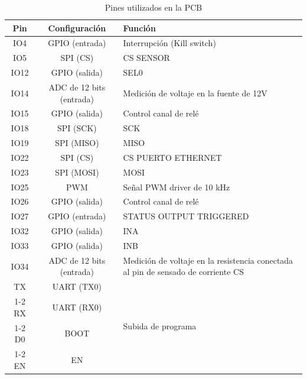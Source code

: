 \begin{table}[H]
\centering
\caption{Pines utilizados en la PCB}
\label{tab:pines_pcb}

\vspace{0.5em}

\begin{tabular}{|c|c|m{6.5cm}|}
\hline
Pin & Configuración & Función \\
\hline
IO4  & GPIO (entrada) & Interrupción (Kill switch) \\
\hline
IO5  & SPI (CS) & CS SENSOR \\
\hline
IO12 & GPIO (salida) & SEL0 \\
\hline
IO14 & ADC de 12 bits (entrada) & Medición de voltaje en la fuente de 12V \\
\hline
IO15 & GPIO (salida) & Control canal de relé \\
\hline
IO18 & SPI (SCK) & SCK \\
\hline
IO19 & SPI (MISO) & MISO \\
\hline
IO22 & SPI (CS) & CS PUERTO ETHERNET \\
\hline
IO23 & SPI (MOSI) & MOSI \\
\hline
IO25 & PWM  & Señal PWM driver de 10 kHz \\
\hline
IO26 & GPIO (salida) & Control canal de relé \\
\hline
IO27 & GPIO (entrada) & STATUS OUTPUT TRIGGERED \\
\hline
IO32   & GPIO (salida) & INA \\
\hline
IO33   & GPIO (salida) & INB \\
\hline
IO34 & ADC de 12 bits (entrada) & Medición de voltaje en la resistencia conectada al pin de sensado de corriente CS \\
\hline
TX  & UART (TX0) & \multirow{4}{=}{Subida de programa} \\
\cline{1-2}
RX  & UART (RX0) &  \\
\cline{1-2}
D0  & BOOT       &  \\
\cline{1-2}
EN  & EN         &  \\
\hline
\end{tabular}
\end{table}





